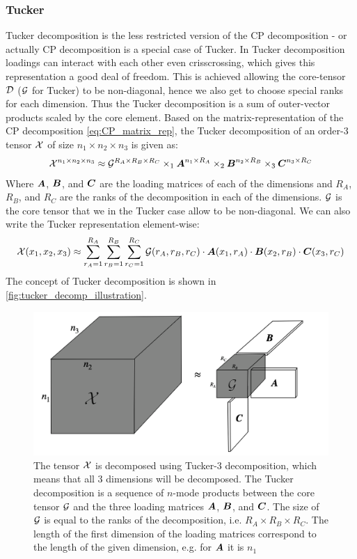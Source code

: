 \subsubsection{Tucker}
Tucker decomposition is the less restricted version of the CP decomposition - or actually CP decomposition is a special case of Tucker. In Tucker decomposition loadings can interact with each other even crisscrossing, which gives this representation a good deal of freedom. This is achieved allowing the core-tensor $\mathcal{D}$ ($\mathcal{G}$ for Tucker) to be non-diagonal, hence we also get to choose special ranks for each dimension. Thus the Tucker decomposition is a sum of outer-vector products scaled by the core element. Based on the matrix-representation of the CP decomposition \eqref{eq:CP_matrix_rep}, the Tucker decomposition of an order-3 tensor $\mathcal{X}$ of size $n_1 \times n_2 \times n_3$ is given as:
\begin{equation}
    \mathcal{X}^{n_1 \times n_2 \times n_3} \approx \mathcal{G}^{R_A \times R_B \times R_C} \times_1 \boldsymbol{A}^{n_1 \times R_A} \times_2 \boldsymbol{B}^{n_2 \times R_B} \times_3 \boldsymbol{C}^{n_3 \times R_C}
\end{equation}
Where $\boldsymbol{A}$, $\boldsymbol{B}$, and $\boldsymbol{C}$ are the loading matrices of each of the dimensions and $R_A$, $R_B$, and $R_C$ are the ranks of the decomposition in each of the dimensions. $\mathcal{G}$ is the core tensor that we in the Tucker case allow to be non-diagonal. We can also write the Tucker representation element-wise:
\begin{equation}
    \mathcal{X}(x_1,x_2,x_3) \approx \sum_{r_A=1}^{R_A} \sum_{r_B=1}^{R_B} \sum_{r_C=1}^{R_C} \mathcal{G}(r_A, r_B, r_C) \cdot \boldsymbol{A}(x_1, r_A) \cdot \boldsymbol{B}(x_2, r_B) \cdot \boldsymbol{C}(x_3, r_C)
\end{equation}
The concept of Tucker decomposition is shown in \autoref{fig:tucker_decomp_illustration}. 
\begin{figure}
    \centering
    \captionsetup{width=.95\linewidth}
    \includegraphics[width=.7\linewidth]{Pics/02_Theory/Tucker_decomp_illustration.png}
    \caption{The tensor $\mathcal{X}$ is decomposed using Tucker-3 decomposition, which means that all 3 dimensions will be decomposed. The Tucker decomposition is a sequence of $n$-mode products between the core tensor $\mathcal{G}$ and the three loading matrices $\boldsymbol{A}$, $\boldsymbol{B}$, and $\boldsymbol{C}$. The size of $\mathcal{G}$ is equal to the ranks of the decomposition, i.e. $R_A \times R_B \times R_C$. The length of the first dimension of the loading matrices correspond to the length of the given dimension, e.g. for $\boldsymbol{A}$ it is $n_1$}
    \label{fig:tucker_decomp_illustration}
\end{figure}
